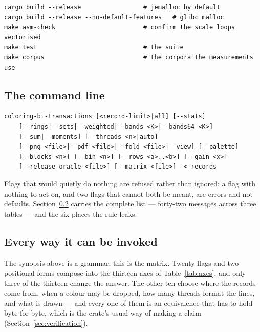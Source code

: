 \documentclass[11pt,a4paper]{article}
\begin{document}
\begin{lstlisting}
cargo build --release                 # jemalloc by default
cargo build --release --no-default-features   # glibc malloc
make asm-check                        # confirm the scale loops vectorised
make test                             # the suite
make corpus                           # the corpora the measurements use
\end{lstlisting}

\subsection{The command line}

\begin{lstlisting}
coloring-bt-transactions [<record-limit>|all] [--stats]
    [--rings|--sets|--weighted|--bands <K>|--bands64 <K>]
    [--sum|--moments] [--threads <n>|auto]
    [--png <file>|--pdf <file>|--fold <file>|--view] [--palette]
    [--blocks <n>] [--bin <n>] [--rows <a>..<b>] [--gain <x>]
    [--release-oracle <file>] [--matrix <file>]  < records
\end{lstlisting}

Flags that would quietly do nothing are refused rather than ignored: a flag
with nothing to act on, and two flags that cannot both be meant, are errors
and not defaults. Section~\ref{sec:invocations} carries the complete list ---
forty-two messages across three tables --- and the six places the rule leaks.

\subsection{Every way it can be invoked}
\label{sec:invocations}

The synopsis above is a grammar; this is the matrix. Twenty flags and two
positional forms compose into the thirteen axes of Table~\ref{tab:axes}, and
only three of the thirteen change the answer. The other ten choose where the
records come from, when a colour may be dropped, how many threads format the
lines, and what is drawn --- and every one of them is an equivalence that has to
hold byte for byte, which is the crate's usual way of making a claim
(Section~\ref{sec:verification}).
\end{document}
